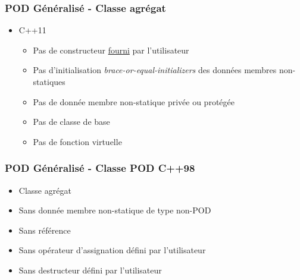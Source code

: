 \documentclass[C++.tex]{subfiles}
\begin{document}
\begin{frame}[fragile]
	\frametitle{POD Généralisé - Classe agrégat}
	\begin{itemize}

		\item C++11
		\begin{itemize}
			\item Pas de constructeur \underline{fourni} par l'utilisateur


			\item Pas d'initialisation \textit{brace-or-equal-initializers} des données membres non-statiques
			\item Pas de donnée membre non-statique privée ou protégée
			\item Pas de classe de base
			\item Pas de fonction virtuelle
		\end{itemize}
	\end{itemize}
\end{frame}

\begin{frame}[fragile]
	\frametitle{POD Généralisé - Classe POD C++98}
	\begin{itemize}
		\item Classe agrégat
		\item Sans donnée membre non-statique de type non-POD
		\item Sans référence
		\item Sans opérateur d'assignation défini par l'utilisateur
		\item Sans destructeur défini par l'utilisateur
	\end{itemize}
\end{frame}
\end{document}
